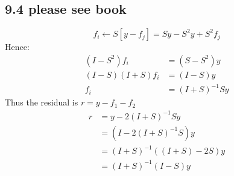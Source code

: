 \subsection*{9.4 please see book}

$$f_i \leftarrow S\left[ y - f_j \right] = Sy - S^2y + S^2 f_j$$
Hence:
\begin{align*}
(I - S^2) f_i &= (S - S^2) y\\
(I - S)(I+S) f_i &= (I - S) y\\
f_i &= (I+S)^{-1} Sy
\end{align*}
Thus the residual is $r = y - f_1 - f_2$
\begin{align*}
    r &= y - 2 (I+S)^{-1} Sy \\
    &= (I - 2 (I+S)^{-1} S) y\\
    &= (I+S)^{-1}((I + S) - 2 S) y\\
    &= (I+S)^{-1} (I - S) y
\end{align*}
